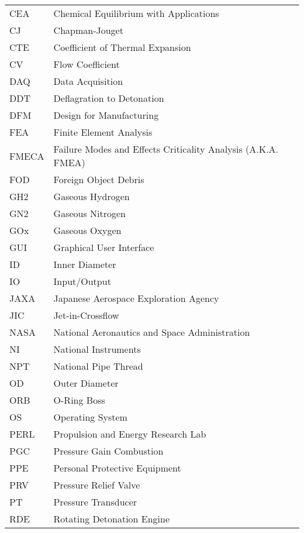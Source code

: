 \vspace{2em}
\setlength{\tabcolsep}{2.5em}
\begin{center}
    \begin{tabular}{l l}
        CEA & Chemical Equilibrium with Applications \\
        CJ & Chapman-Jouget \\
        CTE & Coefficient of Thermal Expansion \\
        CV & Flow Coefficient \\
        DAQ & Data Acquisition \\
        DDT & Deflagration to Detonation \\
        DFM & Design for Manufacturing \\
        FEA & Finite Element Analysis \\
        FMECA & Failure Modes and Effects Criticality Analysis (A.K.A. FMEA) \\
        FOD & Foreign Object Debris \\
        GH2 & Gaseous Hydrogen \\
        GN2 & Gaseous Nitrogen \\
        GOx & Gaseous Oxygen \\
        GUI & Graphical User Interface \\
        ID & Inner Diameter \\
        IO & Input/Output \\
        JAXA & Japanese Aerospace Exploration Agency \\
        JIC & Jet-in-Crossflow \\
        NASA & National Aeronautics and Space Administration \\
        NI & National Instruments \\
        NPT & National Pipe Thread \\
        OD & Outer Diameter \\
        ORB & O-Ring Boss \\
        OS & Operating System \\
        PERL & Propulsion and Energy Research Lab \\
        PGC & Pressure Gain Combustion \\
        PPE & Personal Protective Equipment \\
        PRV & Pressure Relief Valve \\
        PT & Pressure Transducer \\
        RDE & Rotating Detonation Engine \\

\end{tabular}
\end{center}
